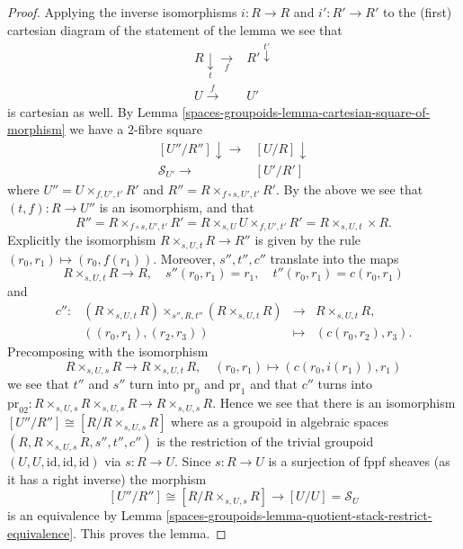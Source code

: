 \begin{proof}
Applying the inverse isomorphisms $i : R \to R$ and $i' : R' \to R'$
to the (first) cartesian diagram of the statement of the lemma we see
that
$$
\begin{array}{cc}R \underset{t}{\downarrow}\underset{f}{\longrightarrow} & R' \overset{t'}{\downarrow} \\ U \overset{f}{\longrightarrow} & U'\end{array}
$$
is cartesian as well. By
Lemma \ref{spaces-groupoids-lemma-cartesian-square-of-morphism}
we have a $2$-fibre square
$$
\begin{array}{cc}[U''/R''] \downarrow\longrightarrow & [U/R] \downarrow \\ \mathcal{S}_{U'} \longrightarrow & [U'/R']\end{array}
$$
where $U'' = U \times_{f, U', t'} R'$ and
$R'' = R \times_{f \circ s, U', t'} R'$. By the above
we see that $(t, f) : R \to U''$ is an isomorphism, and that
$$
R'' =
R \times_{f \circ s, U', t'} R' =
R \times_{s, U} U \times_{f, U', t'} R' =
R \times_{s, U, t} \times R.
$$
Explicitly the isomorphism $R \times_{s, U, t} R \to R''$ is given by
the rule $(r_0, r_1) \mapsto (r_0, f(r_1))$.
Moreover, $s'', t'', c''$ translate into the maps
$$
R \times_{s, U, t} R \to R,
\quad
s''(r_0, r_1) = r_1, \quad t''(r_0, r_1) = c(r_0, r_1)
$$
and
$$
\begin{matrix}
c'' : &
(R \times_{s, U, t} R) \times_{s'', R, t''} (R \times_{s, U, t} R)
&
\longrightarrow
&
R \times_{s, U, t} R, \\
&
((r_0, r_1), (r_2, r_3)) &
\longmapsto & (c(r_0, r_2), r_3).
\end{matrix}
$$
Precomposing with the isomorphism
$$
R \times_{s, U, s} R \longrightarrow R \times_{s, U, t} R,
\quad
(r_0, r_1) \longmapsto (c(r_0, i(r_1)), r_1)
$$
we see that $t''$ and $s''$ turn into
$\text{pr}_0$ and $\text{pr}_1$ and that $c''$ turns into
$\text{pr}_{02} :
R \times_{s, U, s} R \times_{s, U, s} R \to R \times_{s, U, s} R$.
Hence we see that there is an isomorphism
$[U''/R''] \cong [R/R \times_{s, U, s} R]$ where as a groupoid
in algebraic spaces $(R, R \times_{s, U, s} R, s'', t'', c'')$
is the restriction of the trivial groupoid
$(U, U, \text{id}, \text{id}, \text{id})$ via $s : R \to U$.
Since $s : R \to U$ is a surjection of fppf sheaves (as it has a
right inverse) the morphism
$$
[U''/R''] \cong [R/R \times_{s, U, s} R]
\longrightarrow
[U/U] = \mathcal{S}_U
$$
is an equivalence by
Lemma \ref{spaces-groupoids-lemma-quotient-stack-restrict-equivalence}.
This proves the lemma.
\end{proof}

